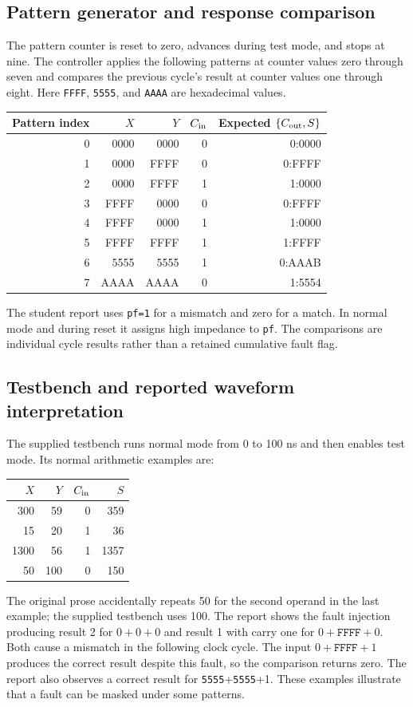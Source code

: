 \documentclass[11pt,a4paper]{article}
\begin{document}
\subsection{Pattern generator and response comparison}
The pattern counter is reset to zero, advances during test mode, and stops at nine. The controller applies the following patterns at counter values zero through seven and compares the previous cycle's result at counter values one through eight. Here \texttt{FFFF}, \texttt{5555}, and \texttt{AAAA} are hexadecimal values.

\begin{center}
\begin{tabular}{rrrrr}\toprule
Pattern index&$X$&$Y$&$C_{\rm in}$&Expected $\{C_{\rm out},S\}$\\\midrule
0&0000&0000&0&0:0000\\
1&0000&FFFF&0&0:FFFF\\
2&0000&FFFF&1&1:0000\\
3&FFFF&0000&0&0:FFFF\\
4&FFFF&0000&1&1:0000\\
5&FFFF&FFFF&1&1:FFFF\\
6&5555&5555&1&0:AAAB\\
7&AAAA&AAAA&0&1:5554\\\bottomrule
\end{tabular}
\end{center}

The student report uses \texttt{pf=1} for a mismatch and zero for a match. In normal mode and during reset it assigns high impedance to \texttt{pf}. The comparisons are individual cycle results rather than a retained cumulative fault flag.

\subsection{Testbench and reported waveform interpretation}
The supplied testbench runs normal mode from 0 to 100 ns and then enables test mode. Its normal arithmetic examples are:
\begin{center}
\begin{tabular}{rrrr}\toprule
$X$&$Y$&$C_{\rm in}$&$S$\\\midrule
300&59&0&359\\15&20&1&36\\1300&56&1&1357\\50&100&0&150\\\bottomrule
\end{tabular}
\end{center}
The original prose accidentally repeats 50 for the second operand in the last example; the supplied testbench uses 100. The report shows the fault injection producing result 2 for $0+0+0$ and result 1 with carry one for $0+\texttt{FFFF}+0$. Both cause a mismatch in the following clock cycle. The input $0+\texttt{FFFF}+1$ produces the correct result despite this fault, so the comparison returns zero. The report also observes a correct result for \texttt{5555}+\texttt{5555}+1. These examples illustrate that a fault can be masked under some patterns.
\end{document}
